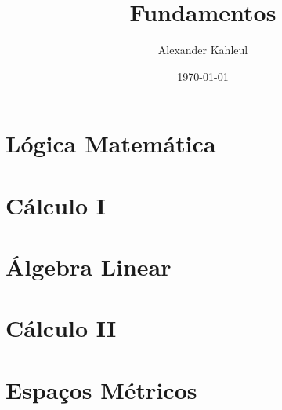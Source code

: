 \documentclass[12pt, a4paper, openany, oneside]{book}
\title{Fundamentos}
\author{Alexander Kahleul}
\date{\today}
\theoremstyle{meuestilo}
\begin{document}
\maketitle
\setcounter{page}{2}
\tableofcontents


\part{Lógica Matemática}


\part{Cálculo I}

\part{Álgebra Linear}

\part{Cálculo II}

\part{Espaços Métricos}



\nocite{*}
\printbibliography[heading=bibintoc]
\end{document}
